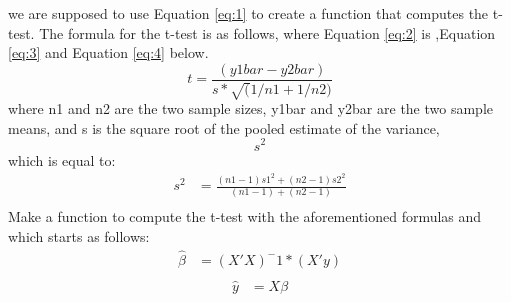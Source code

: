 \documentclass{article}
\begin{document}
\medskip we are supposed to use Equation \ref{eq:1} to create a function that computes the t-test. The formula for the t-test is as follows,  where Equation \ref{eq:2} is ,Equation \ref{eq:3} and Equation \ref{eq:4} below.
\begin{equation} \label{eq:1}
t =\frac{({y1bar}-{y2bar})}{s*\sqrt(1/n1+1/n2)}
\end{equation}
where n1 and n2 are the two sample sizes, y1bar and y2bar are the two sample means, and s is the square root of the pooled estimate of the variance, \begin{equation*} s^2\end{equation*} which is equal to:
\begin{equation} \label{eq:2}
\begin{split}
s^2 & = \frac{(n1- 1)s1^2 + (n2- 1)s2^2}{(n1-1)+ (n2-1)} \\
\end{split}
\end{equation}
Make a function to compute the t-test with the aforementioned formulas and which starts as follows:
\begin{equation} \label{eq:3}
\begin{split}
\hat{\beta}& =(X'X)^-1*(X'y)\\
\end{split}
\end{equation}
\begin{equation} \label{eq:4}
\begin{split}
\hat{y}& = X\beta\\
\end{split}
\end{equation}


\end{document}
